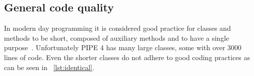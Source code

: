 \subsection{General code quality}
In modern day programming it is considered good practice for classes and methods to be short, composed of auxiliary methods and to have a single purpose~\cite{so_can_a_function_be_too_short}. Unfortunately PIPE 4 has many large classes, some with over \num{3000} lines of code. Even the shorter classes do not adhere to good coding practices as can be seen in ~\cref{lst:identical}.

